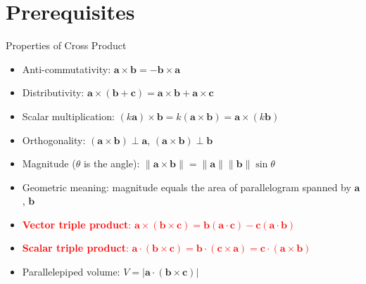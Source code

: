 \section{Prerequisites}

\begin{frame}{Properties of Cross Product}
    \begin{itemize}
        \setlength{\itemsep}{0.5em}
        \setlength{\parskip}{0.2em}
        \item Anti-commutativity: $\mathbf{a} \times \mathbf{b} = -\mathbf{b} \times \mathbf{a}$
        \item Distributivity: $\mathbf{a} \times (\mathbf{b} + \mathbf{c}) = \mathbf{a} \times \mathbf{b} + \mathbf{a} \times \mathbf{c}$
        \item Scalar multiplication: $(k\mathbf{a}) \times \mathbf{b} = k(\mathbf{a} \times \mathbf{b}) = \mathbf{a} \times (k\mathbf{b})$
        \item Orthogonality: $(\mathbf{a} \times \mathbf{b}) \perp \mathbf{a}$, $(\mathbf{a} \times \mathbf{b}) \perp \mathbf{b}$
        \item Magnitude ($\theta$ is the angle): $\|\mathbf{a} \times \mathbf{b}\| = \|\mathbf{a}\|\|\mathbf{b}\|\sin\theta$
        \item Geometric meaning: magnitude equals the area of parallelogram spanned by $\mathbf{a}$, $\mathbf{b}$
        \item \textcolor{red}{\textbf{Vector triple product}: $\mathbf{a} \times (\mathbf{b} \times \mathbf{c}) = \mathbf{b}(\mathbf{a} \cdot \mathbf{c}) - \mathbf{c}(\mathbf{a} \cdot \mathbf{b})$}
        \item \textcolor{red}{\textbf{Scalar triple product}: $\mathbf{a} \cdot (\mathbf{b} \times \mathbf{c}) = \mathbf{b} \cdot (\mathbf{c} \times \mathbf{a}) = \mathbf{c} \cdot (\mathbf{a} \times \mathbf{b})$}
        \item Parallelepiped volume: $V = |\mathbf{a} \cdot (\mathbf{b} \times \mathbf{c})|$
    \end{itemize}
\end{frame}

